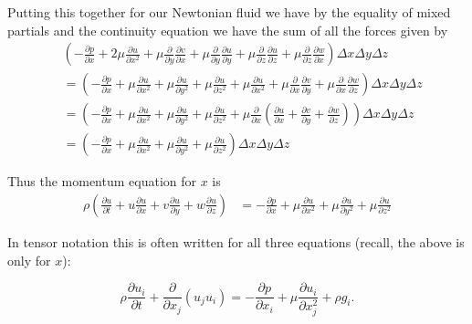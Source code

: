 \documentclass[12pt]{report}
\begin{document}
Putting this together for our Newtonian fluid we have by the equality of mixed partials and the continuity equation we have the sum of all the forces given by
\begin{align*} & \left (-\frac{\partial p}{\partial x} + 2 \mu \frac{\partial u}{\partial x^2} + \mu \frac{\partial}{\partial y} \frac{\partial v}{\partial x} + \mu \frac{\partial }{\partial y} \frac{\partial u}{\partial y} + \mu \frac{\partial }{\partial z} \frac{\partial u}{\partial z} + \mu \frac{\partial }{\partial z} \frac{\partial w}{\partial x}\right ) \Delta x \Delta y \Delta z\\
& = \left ( -\frac{\partial p}{\partial x} + \mu \frac{\partial u}{\partial x^2} + \mu\frac{\partial u}{\partial y^2} + \mu \frac{\partial u}{\partial z^2}  + \mu \frac{\partial u}{\partial x^2} + \mu \frac{\partial}{\partial x} \frac{\partial v}{\partial y} + \mu \frac{\partial }{\partial x} \frac{\partial w}{\partial z} \right ) \Delta x \Delta y \Delta z\\
& = \left (-\frac{\partial p}{\partial x} + \mu \frac{\partial u}{\partial x^2} + \mu\frac{\partial u}{\partial y^2} + \mu \frac{\partial u}{\partial z^2}  + \mu \frac{\partial }{\partial x}\left ( \frac{\partial u}{\partial x} + \frac{\partial v}{\partial y} + \frac{\partial w}{\partial z} \right ) \right ) \Delta x \Delta y \Delta z\\
& = \left ( -\frac{\partial p}{\partial x} + \mu \frac{\partial u}{\partial x^2} + \mu\frac{\partial u}{\partial y^2} + \mu \frac{\partial u}{\partial z^2}\right ) \Delta x \Delta y \Delta z\end{align*}

Thus the momentum equation for $x$ is
\begin{align}  \rho \left ( \frac{\partial u }{\partial t} + u \frac{\partial u }{\partial x} + v \frac{\partial u}{\partial y} + w \frac{\partial u}{\partial z} \right ) &= -\frac{\partial p}{\partial x} + \mu \frac{\partial u}{\partial x^2} + \mu\frac{\partial u}{\partial y^2} + \mu \frac{\partial u}{\partial z^2}\end{align}

In tensor notation this is often written for all three equations (recall, the above is only for $x$):

\begin{equation} \rho \frac{\partial u_i}{\partial t} + \frac{\partial}{\partial x_j} \left( u_j u_i \right) = -\frac{\partial p}{\partial x_i}  + \mu \frac{\partial u_i}{\partial x_j^2}  + \rho g_i . \end{equation}
\end{document}
